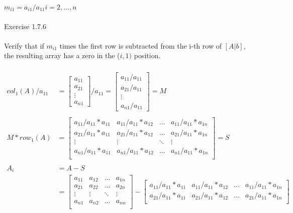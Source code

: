 \documentclass[10pt,a4paper]{article}
\author{Daniel Frederico Lins Leite}
\begin{document}
	
	$ m_{i1} = a_{i1}/a_{11} i = 2, ..., n$\\
	\\	
	Exercise 1.7.6\\
	\\
	Verify that if $m_{i1}$ times the first row is subtracted from the i-th row of $[A | b]$, the resulting array has a zero in the ($i, 1)$ position.\\
	\\
	\begin{align*}
		col_1(A) / a_{11} &= \begin{bmatrix}
			a_{11}\\a_{21}\\ \vdots \\a_{n1} 
		\end{bmatrix} / a_{11} = \begin{bmatrix}
		a_{11} / a_{11}\\a_{21} / a_{11}\\ \vdots \\a_{n1} / a_{11} 
		\end{bmatrix} = M\\
		\\
		M*row_1(A) &= \begin{bmatrix}
			a_{11} / a_{11} * a_{11} & 	a_{11} / a_{11} * a_{12} & ... & a_{11} / a_{11} * a_{1n}\\
			a_{21} / a_{11} * a_{11} & 	a_{21} / a_{11} * a_{12} & ... & a_{21} / a_{11} * a_{1n}\\
			\vdots & \vdots & \ddots & \vdots \\
			a_{n1} / a_{11} * a_{11} & 	a_{n1} / a_{11} * a_{12} & ... & a_{n1} / a_{11} * a_{1n}\\
		\end{bmatrix} = S\\
		\\
		A_i &= A - S\\
		&= \begin{bmatrix}
		a_{11} & a_{12} & ... & a_{1n}\\
		a_{21} & a_{22} & ... & a_{2n}\\
		\vdots & \vdots & \ddots & \vdots \\
		a_{n1} & a_{n2} & ... & a_{nn}\\
		\end{bmatrix} -  \begin{bmatrix}
		a_{11} / a_{11} * a_{11} & 	a_{11} / a_{11} * a_{12} & ... & a_{11} / a_{11} * a_{1n}\\
		a_{21} / a_{11} * a_{11} & 	a_{21} / a_{11} * a_{12} & ... & a_{21} / a_{11} * a_{1n}\\

\end{bmatrix}
\end{align*}
\end{document}
